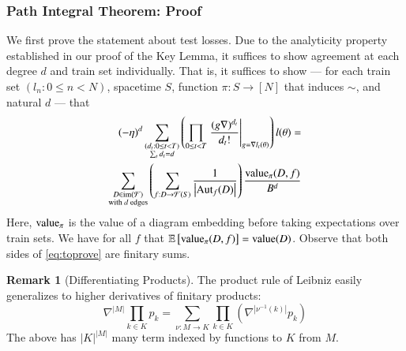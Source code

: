 \documentclass{article}
\theoremstyle{plain}
\theoremstyle{definition}
\newtheorem{rmk}{Remark}
\newcommand{\wrap}[1]{\left(#1\right)}
\newcommand{\wabs}[1]{\left|#1\right|}
\newcommand{\Free}{\mathcal{F}}
\newcommand{\Aut}{\text{\textnormal{Aut}}}
\newcommand{\image}{\text{\textnormal{im}}}
\newcommand{\dvalue}{\text{\textnormal{value}}}
\newcommand{\expct}[1]{\mathbb{E}\left[#1\right]}
\begin{document}
        \subsubsection*{Path Integral Theorem: Proof}
            We first prove the statement about test losses.
            Due to the analyticity property established in our proof of the
            Key Lemma, it suffices to show agreement at each degree $d$ and
            train set individually.  That is, it suffices to show --- for
            each train set $(l_n: 0\leq n<N)$, spacetime $S$, function $\pi:
            S\to [N]$ that induces $\sim$, and natural $d$ --- that
            \begin{align} \label{eq:toprove}
                (-\eta)^d
                \sum_{\substack{
                    (d_t: 0\leq t<T) \\
                    \sum_t d_t = d
                }}
                \wrap{
                    \prod_{0 \leq t < T} \left.
                        \frac{(g \nabla)^{d_t}}{d_t!}
                    \right|_{g=\nabla l_t(\theta)}
                } l (\theta)
                = \nonumber \\
                \sum_{\substack{
                    D \in \image(\Free) \\
                    \textnormal{with $d$ edges}
                }}
                \wrap{
                    \sum_{f: D\to\Free(S)}
                    \frac{1}{\wabs{\Aut_f(D)}}
                }
                \frac{\dvalue_\pi(D, f)}{B^{d}}
            \end{align}
            Here, $\dvalue_\pi$ is the value of a diagram embedding before
            taking expectations over train sets.  We have for all $f$ that
            $\expct{\dvalue_\pi(D, f)} = \dvalue(D)$.
            Observe that both sides of \ref{eq:toprove} are finitary sums.

            \begin{rmk}[Differentiating Products] \label{rmk:leibniz}
                The product rule of Leibniz easily generalizes to higher
                derivatives of finitary products:
                $$
                    \nabla^{\wabs{M}} \prod_{k \in K} p_k
                    = 
                    \sum_{\nu:M\to K} \prod_{k\in K} \wrap{
                        \nabla^{\wabs{\nu^{-1}(k)}} p_k
                    }
                $$
                The above has $\wabs{K}^{\wabs{M}}$ many term indexed by
                functions to $K$ from $M$.
            \end{rmk}
\end{document}
